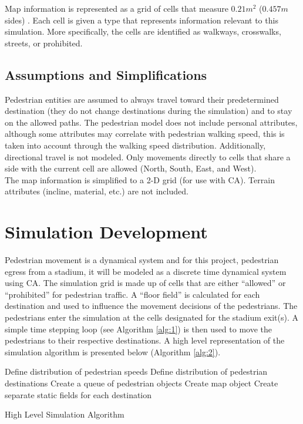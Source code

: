 \documentclass[paper=a4, fontsize=11pt]{scrartcl}
\numberwithin{equation}{section}		%
\numberwithin{figure}{section}			%
\numberwithin{table}{section}		    %
\begin{document}
	\noindent
	Map information is represented as a grid of cells that measure $0.21 m^2$ ($0.457 m$ sides) 
	\cite{blue2001cellular}. Each cell is given a type that represents information relevant to this 
	simulation. More specifically, the cells are identified as walkways, crosswalks, streets, or 
	prohibited.\\
	
	\subsection{Assumptions and Simplifications}
	Pedestrian entities are assumed to always travel toward their predetermined destination (they 
	do not change destinations during the simulation) and to stay on the allowed paths. The 
	pedestrian model does not include personal attributes, although some attributes may correlate 
	with pedestrian walking speed, this is taken into account through the walking speed 
	distribution. Additionally, directional travel is not modeled. Only movements directly to cells 
	that share a side with the current cell are allowed (North, South, East, and West).\\
	
	\noindent
	The map information is simplified to a 2-D grid (for use with CA). Terrain attributes (incline, 
	material, etc.) are not included.\\
	
	\section{Simulation Development}
	Pedestrian movement is a dynamical system and for this project, pedestrian egress from a 
	stadium, it will be modeled as a discrete time dynamical system using CA. The simulation grid 
	is made up of cells that are either ``allowed'' or ``prohibited'' for pedestrian traffic. A 
	``floor field'' \cite{varas2007cellular} is calculated for each destination and used to 
	influence the movement decisions of the pedestrians. The pedestrians enter the simulation at 
	the cells designated for the stadium exit(s). A simple time stepping loop (see Algorithm 
	\ref{alg:1}) is then used to move the pedestrians to their respective destinations. A high 
	level representation of the simulation algorithm is presented below (Algorithm \ref{alg:2}).
	
	\begin{algorithm}[h]
	  \DontPrintSemicolon
	  Define distribution of pedestrian speeds\;
	  Define distribution of pedestrian destinations\;
	  Create a queue of pedestrian objects\;
	  Create map object\;
	  Create separate static fields for each destination\;
	  \caption{High Level Simulation Algorithm \label{alg:2}}
	\end{algorithm}
	
\end{document}
